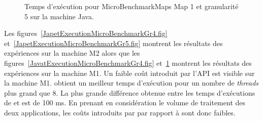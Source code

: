 \begin{figure}[H]
\centering
    \caption{Temps d'ex\'ecution pour MicroBenchmarkMaps Map 1 et granularit\'e 5 sur la machine Java.}
    \label{JavaExecutionMicroBenchmarkGr5.fig}	
\end{figure}



Les figures~\ref{JapetExecutionMicroBenchmarkGr4.fig} et~\ref{JapetExecutionMicroBenchmarkGr5.fig} montrent les r\'esultats des exp\'eriences sur la machine M2 alors que les figures~\ref{JavatExecutionMicroBenchmarkGr4.fig} et~\ref{JavaExecutionMicroBenchmarkGr5.fig} montrent les r\'esultats des exp\'eriences sur la machine M1. Un faible co\^ut introduit par l'API est visible sur la machine M1.  obtient un meilleur temps d'ex\'ecution pour un nombre de \emph{threads} plus grand que 8. La plus grande diff\'erence obtenue entre les temps d'ex\'ecutions de  et  est de 100 ms. En prenant en consid\'eration le volume de traitement des deux applications, les co\^uts introduits par  par rapport \`a  sont donc faibles.




